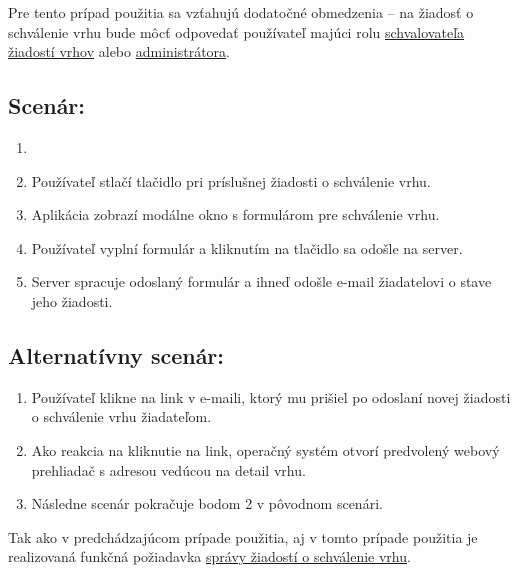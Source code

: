 Pre tento prípad použitia sa vzťahujú dodatočné obmedzenia -- na žiadosť o schválenie vrhu bude môcť odpovedať používateľ majúci rolu \hyperref[schvalovatel-vrhov]{schvalovateľa žiadostí vrhov} alebo \hyperref[administrator]{administrátora}.

\pagebreak 
\subsection*{Scenár:}

\begin{enumerate}
	\item {}
	\item Používateľ stlačí tlačidlo  pri príslušnej žiadosti o schválenie vrhu.
	\item Aplikácia zobrazí modálne okno s formulárom pre schválenie vrhu.
	\item Používateľ vyplní formulár a kliknutím na tlačidlo  sa odošle na server.
	\item Server spracuje odoslaný formulár a ihneď odošle e-mail žiadatelovi o stave jeho žiadosti.
\end{enumerate}

\subsection*{Alternatívny scenár:}

\begin{enumerate}
	\item Používateľ klikne na link v e-maili, ktorý mu prišiel po odoslaní novej žiadosti o schválenie vrhu žiadateľom.
	\item Ako reakcia na kliknutie na link, operačný systém otvorí predvolený webový prehliadač s adresou vedúcou na detail vrhu.
	\item Následne scenár pokračuje bodom 2 v pôvodnom scenári.
\end{enumerate}

Tak ako v predchádzajúcom prípade použitia, aj v tomto prípade použitia je realizovaná funkčná požiadavka \hyperref[sprava-ziadosti-o-schvalenie-vrhu]{správy žiadostí o schválenie vrhu}.
	